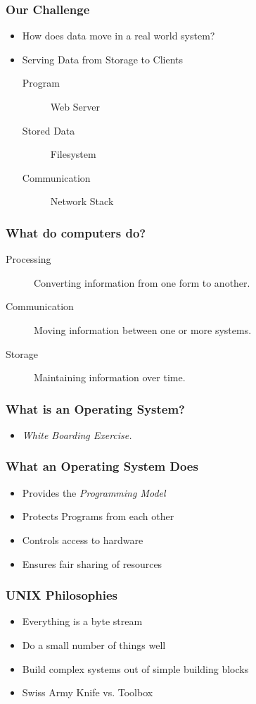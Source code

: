 \documentclass[pdftex]{beamer} %
\begin{document}
\begin{frame}
  \frametitle{Our Challenge}
  \begin{itemize}
  \item How does data move in a real world system?
  \item Serving Data from Storage to Clients
    \begin{description}
    \item[Program] Web Server
    \item[Stored Data] Filesystem
    \item[Communication] Network Stack
    \end{description}
  \end{itemize}
\end{frame}

\begin{frame}
  \frametitle{What do computers do?}
  \begin{description}
  \item[Processing] Converting information from one form to another.
  \item[Communication] Moving information between one or more systems.
  \item[Storage] Maintaining information over time.
  \end{description}
\end{frame}

\begin{frame}
  \frametitle{What is an Operating System?}
  \begin{center}
    \begin{itemize}
    \item \emph{White Boarding Exercise.}
    \end{itemize}
  \end{center}
\end{frame}

\begin{frame}
  \frametitle{What an Operating System Does}
  \begin{itemize}
  \item Provides the \emph{Programming Model}
  \item Protects Programs from each other
  \item Controls access to hardware
  \item Ensures fair sharing of resources
  \end{itemize}
\end{frame}

\begin{frame}
  \frametitle{UNIX Philosophies}
  \begin{itemize}
  \item Everything is a byte stream
  \item Do a small number of things well
  \item Build complex systems out of simple building blocks
  \item Swiss Army Knife vs. Toolbox
  \end{itemize}
\end{frame}
\end{document}
